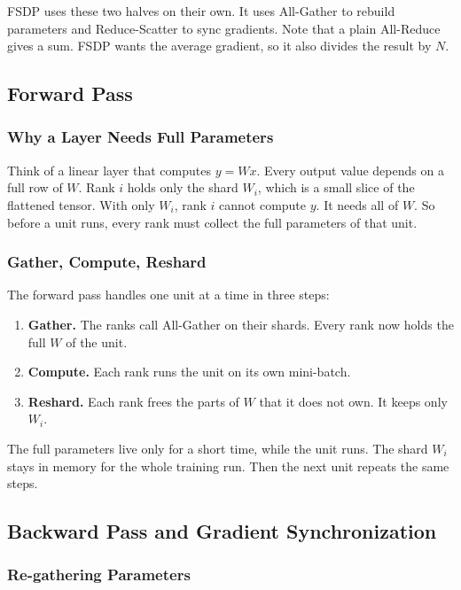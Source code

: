 \documentclass[11pt]{article}
\theoremstyle{definition}
\theoremstyle{plain}
\begin{document}
FSDP uses these two halves on their own. It uses All-Gather to rebuild
parameters and Reduce-Scatter to sync gradients. Note that a plain
All-Reduce gives a sum. FSDP wants the average gradient, so it also
divides the result by $N$.

\subsection{Forward Pass}
\label{sec:forward}

\subsubsection{Why a Layer Needs Full Parameters}
\label{sec:why-full}

Think of a linear layer that computes $y = Wx$. Every output value
depends on a full row of $W$. Rank $i$ holds only the shard $W_i$, which
is a small slice of the flattened tensor. With only $W_i$, rank $i$
cannot compute $y$. It needs all of $W$. So before a unit runs, every
rank must collect the full parameters of that unit.

\subsubsection{Gather, Compute, Reshard}
\label{sec:gather-compute-reshard}

The forward pass handles one unit at a time in three steps:
\begin{enumerate}
  \item \textbf{Gather.} The ranks call All-Gather on their shards.
    Every rank now holds the full $W$ of the unit.
  \item \textbf{Compute.} Each rank runs the unit on its own
    mini-batch.
  \item \textbf{Reshard.} Each rank frees the parts of $W$ that it does
    not own. It keeps only $W_i$.
\end{enumerate}
The full parameters live only for a short time, while the unit runs.
The shard $W_i$ stays in memory for the whole training run. Then the
next unit repeats the same steps.

\subsection{Backward Pass and Gradient Synchronization}
\label{sec:backward}

\subsubsection{Re-gathering Parameters}
\label{sec:regather}
\end{document}
